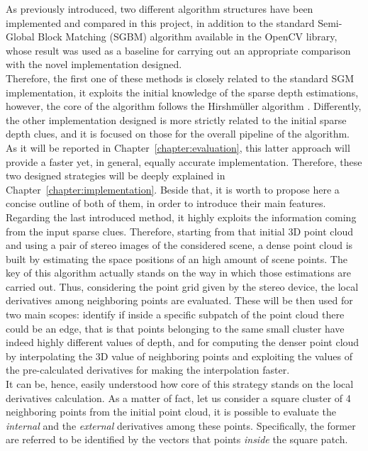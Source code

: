 As previously introduced, two different algorithm structures have been implemented and compared in this project, in addition to the standard Semi-Global Block Matching (SGBM) algorithm available in the OpenCV library, whose result was used as a baseline for carrying out an appropriate comparison with the novel implementation designed. \\
Therefore, the first one of these methods is closely related to the standard SGM implementation, it exploits the initial knowledge of the sparse depth estimations, however, the core of the algorithm follows the Hirshm\"{u}ller algorithm \cite{Hirschmuller2008}. 
Differently, the other implementation designed is more strictly related to the initial sparse depth clues, and it is focused on those for the overall pipeline of the algorithm.
As it will be reported in Chapter~\ref{chapter:evaluation}, this latter approach will provide a faster yet, in general, equally accurate implementation.
Therefore, these two designed strategies will be deeply explained in Chapter~\ref{chapter:implementation}.
Beside that, it is worth to propose here a concise outline of both of them, in order to introduce their main features.\\
Regarding the last introduced method, it highly exploits the information coming from the input sparse clues.
Therefore, starting from that initial 3D point cloud and using a pair of stereo images of the considered scene, a dense point cloud is built by estimating the space positions of an high amount of scene points. 
The key of this algorithm actually stands on the way in which those estimations are carried out. 
Thus, considering the point grid given by the stereo device, the local derivatives among neighboring points are evaluated. 
These will be then used for two main scopes: identify if inside a specific subpatch of the point cloud there could be an edge, that is that points belonging to the same small cluster have indeed highly different values of depth, and for computing the denser point cloud by interpolating the 3D value of neighboring points and exploiting the values of the pre-calculated derivatives for making the interpolation faster.\\
It can be, hence, easily understood how core of this strategy stands on the local derivatives calculation. 
As a matter of fact, let us consider a square cluster of 4 neighboring points from the initial point cloud, it is possible to evaluate the \textit{internal} and the \textit{external} derivatives among these points.
Specifically, the former are referred to be identified by the vectors that points \textit{inside} the square patch. 
